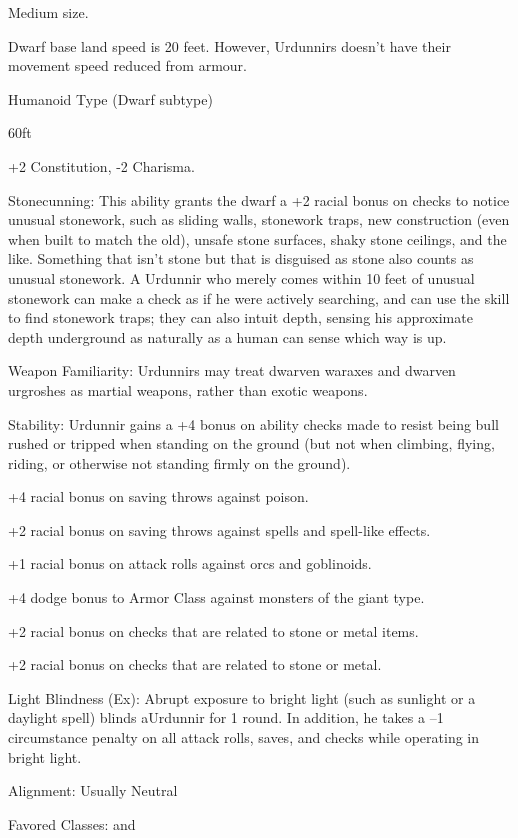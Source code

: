 \begin{multicols}{2}

\begin{itemize*}
\item Medium size.
\item Dwarf base land speed is 20 feet. However, Urdunnirs doesn't have their movement speed reduced from armour.
\item Humanoid Type (Dwarf subtype)
\item {} 60ft
\item +2 Constitution, -2 Charisma.
\item Stonecunning: This ability grants the dwarf a +2 racial bonus on  checks to notice unusual stonework, such as sliding walls, stonework traps, new construction (even when built to match the old), unsafe stone surfaces, shaky stone ceilings, and the like. Something that isn't stone but that is disguised as stone also counts as unusual stonework. A Urdunnir who merely comes within 10 feet of unusual stonework can make a  check as if he were actively searching, and can use the  skill to find stonework traps; they can also intuit depth, sensing his approximate depth underground as naturally as a human can sense which way is up.
\item Weapon Familiarity: Urdunnirs may treat dwarven waraxes and dwarven urgroshes as martial weapons, rather than exotic weapons.
\item Stability: Urdunnir gains a +4 bonus on ability checks made to resist being bull rushed or tripped when standing on the ground (but not when climbing, flying, riding, or otherwise not standing firmly on the ground).
\item +4 racial bonus on saving throws against poison.
\item +2 racial bonus on saving throws against spells and spell-like effects.
\item +1 racial bonus on attack rolls against orcs and goblinoids.
\item +4 dodge bonus to Armor Class against monsters of the giant type.
\item +2 racial bonus on  checks that are related to stone or metal items.
\item +2 racial bonus on  checks that are related to stone or metal.
\item Light Blindness (Ex): Abrupt exposure to bright light (such as sunlight or a daylight spell) blinds aUrdunnir for 1 round. In addition, he takes a –1 circumstance penalty on all attack rolls, saves, and checks while operating in bright light.
\item Alignment: Usually Neutral
\item Favored Classes:  and 
\end{itemize*}


\end{multicols}
